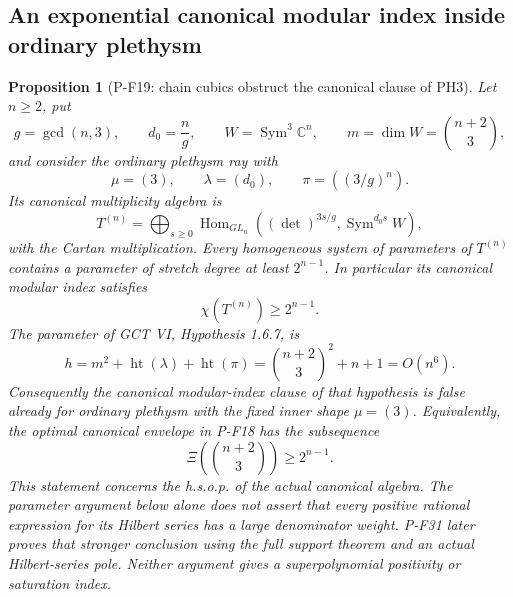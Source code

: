 \documentclass[11pt,a4paper]{article}
\newtheorem{proposition}{Proposition}[section]
\begin{document}
\subsection{An exponential canonical modular index inside ordinary plethysm}

\begin{proposition}[P-F19: chain cubics obstruct the canonical clause of PH3]
\label{prop:cubiccanonicalcounterexample}
Let $n\ge2$, put
\[
 g=\gcd(n,3),\qquad d_0=\frac ng,\qquad
 W=\operatorname{Sym}^3\mathbb C^n,\qquad
 m=\dim W=\binom{n+2}{3},
\]
and consider the ordinary plethysm ray with
\[
 \mu=(3),\qquad \lambda=(d_0),\qquad
 \pi=((3/g)^n).
 \tag{P-F19a}
\]
Its canonical multiplicity algebra is
\[
 T^{(n)}=\bigoplus_{s\ge0}
  \operatorname{Hom}_{GL_n}
  \left((\det)^{3s/g},\operatorname{Sym}^{d_0s}W\right),
 \tag{P-F19b}
\]
with the Cartan multiplication. Every homogeneous system of parameters
of $T^{(n)}$ contains a parameter of stretch degree at least
$2^{n-1}$. In particular its canonical modular index satisfies
\[
 \chi(T^{(n)})\ge2^{n-1}.
 \tag{P-F19c}
\]
The parameter of GCT VI, Hypothesis 1.6.7, is
\[
 h=m^2+\operatorname{ht}(\lambda)+\operatorname{ht}(\pi)
   =\binom{n+2}{3}^{\!2}+n+1=O(n^6).
 \tag{P-F19d}
\]
Consequently the canonical modular-index clause of that hypothesis
is false already for ordinary plethysm with the fixed inner shape
$\mu=(3)$. Equivalently, the optimal canonical envelope in P-F18
has the subsequence
\[
 \Xi\!\left(\binom{n+2}{3}\right)\ge2^{n-1}.
 \tag{P-F19e}
\]
This statement concerns the h.s.o.p. of the actual canonical algebra.
The parameter argument below alone does not assert that every positive
rational expression for its Hilbert series has a large denominator
weight. P-F31 later proves that stronger conclusion using the full
support theorem and an actual Hilbert-series pole. Neither argument
gives a superpolynomial positivity or saturation index.
\end{proposition}
\end{document}
